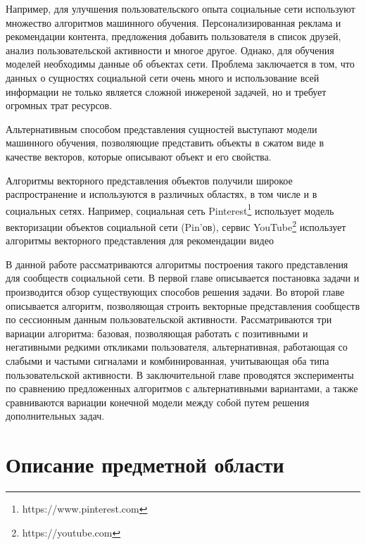 \documentclass[times,specification,annotation]{itmo-student-thesis}
\begin{document}
Например, для улучшения пользовательского опыта социальные сети используют множество алгоритмов машинного обучения. Персонализированная реклама и рекомендации контента, предложения добавить пользователя в список друзей, анализ пользовательской активности и многое другое. Однако, для обучения моделей необходимы данные об объектах сети. Проблема заключается в том, что данных о сущностях социальной сети очень много и использование всей информации не только является сложной инжереной задачей, но и требует огромных трат ресурсов.   

Альтернативным способом представления сущностей выступают модели машинного обучения, позволяющие представить объекты в сжатом виде в качестве векторов, которые описывают объект и его свойства.


Алгоритмы векторного представления объектов получили широкое распространение и используются в различных областях, в том числе и в социальных сетях. Например, социальная сеть Pinterest\footnote{https://www.pinterest.com} \cite{Liu2017} использует модель векторизации объектов социальной сети (Pin'ов), сервис YouTube\footnote{https://youtube.com} использует алгоритмы векторного представления для рекомендации видео\cite{Covington2016} 

В данной работе рассматриваются алгоритмы построения такого представления для сообществ социальной сети. В первой главе описывается постановка задачи и производится обзор существующих способов решения задачи. Во второй главе описывается алгоритм, позволяющая строить векторные представления сообществ по сессионным данным пользовательской активности. Рассматриваются три вариации алгоритма: базовая, позволяющая работать с позитивными и негативными редкими откликами пользователя, альтернативная, работающая со слабыми и частыми сигналами и комбинированная, учитывающая оба типа пользовательской активности. В заключительной главе проводятся эксперименты по сравнению предложенных алгоритмов с альтернативными вариантами, а также сравниваются вариации конечной модели между собой путем решения дополнительных задач. 

\chapter{Описание предметной области}
\end{document}
